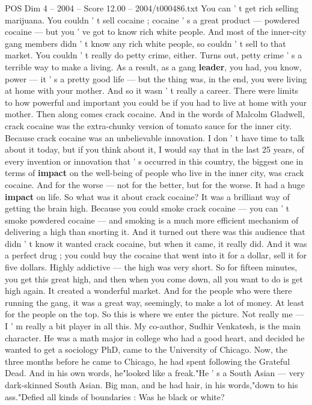 \begin{textsample}{POS Dim 4 – 2004 – Score 12.00 – 2004/t000486.txt}
You can ' t get rich selling marijuana.
You couldn ' t sell cocaine ; cocaine ' s a great product — powdered cocaine — but you ' ve got to know rich white people.
And most of the inner-city gang members didn ' t know any rich white people, so couldn ' t sell to that market.
You couldn ' t really do petty crime, either.
Turns out, petty crime ' s a terrible way to make a living.
As a result, as a gang \textbf{leader}, you had, you know, power — it ' s a pretty good life — but the thing was, in the end, you were living at home with your mother.
And so it wasn ' t really a career.
There were limits to how powerful and important you could be if you had to live at home with your mother.
Then along comes crack cocaine.
And in the words of Malcolm Gladwell, crack cocaine was the extra-chunky version of tomato sauce for the inner city.
Because crack cocaine was an unbelievable innovation.
I don ' t have time to talk about it today, but if you think about it, I would say that in the last 25 years, of every invention or innovation that ' s occurred in this country, the biggest one in terms of \textbf{impact} on the well-being of people who live in the inner city, was crack cocaine.
And for the worse — not for the better, but for the worse.
It had a huge \textbf{impact} on life.
So what was it about crack cocaine?
It was a brilliant way of getting the brain high.
Because you could smoke crack cocaine — you can ' t smoke powdered cocaine — and smoking is a much more efficient mechanism of delivering a high than snorting it.
And it turned out there was this audience that didn ' t know it wanted crack cocaine, but when it came, it really did.
And it was a perfect drug ; you could buy the cocaine that went into it for a dollar, sell it for five dollars.
Highly addictive — the high was very short.
So for fifteen minutes, you get this great high, and then when you come down, all you want to do is get high again.
It created a wonderful market.
And for the people who were there running the gang, it was a great way, seemingly, to make a lot of money.
At least for the people on the top.
So this is where we enter the picture.
Not really me — I ' m really a bit player in all this.
My co-author, Sudhir Venkatesh, is the main character.
He was a math major in college who had a good heart, and decided he wanted to get a sociology PhD, came to the University of Chicago.
Now, the three months before he came to Chicago, he had spent following the Grateful Dead.
And in his own words, he"looked like a freak."He ' s a South Asian — very dark-skinned South Asian.
Big man, and he had hair, in his words,"down to his ass."Defied all kinds of boundaries : Was he black or white?

\end{textsample}
